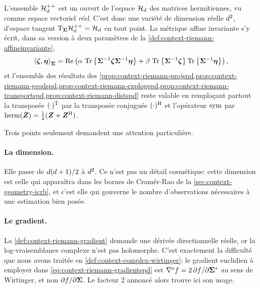 \begin{property}
\label{prop:context-riemann-conehermitien}
  L'ensemble $\mathcal{H}_{d}^{++}$ est un ouvert de l'espace $\mathcal{H}_{d}$ des matrices hermitiennes, vu comme espace vectoriel \emph{réel}. C'est donc une variété de dimension réelle $d^2$, d'espace tangent $\mathrm{T}_{\boldsymbol{\Sigma}}\mathcal{H}_{d}^{++}=\mathcal{H}_{d}$ en tout point. La métrique affine invariante s'y écrit, dans sa version à deux paramètres de la \cref{def:context-riemann-affineinvariante},
  \begin{equation}
    \left\langle \boldsymbol{\zeta}, \boldsymbol{\eta} \right\rangle_{\boldsymbol{\Sigma}}
    =
    \operatorname{\operatorname{Re}}\left(
      \alpha\,\operatorname{\operatorname{Tr}}\left\{{\boldsymbol{\Sigma}}^{-1}\boldsymbol{\zeta}{\boldsymbol{\Sigma}}^{-1}\boldsymbol{\eta}\right\}
      +
      \beta\,\operatorname{\operatorname{Tr}}\left\{{\boldsymbol{\Sigma}}^{-1}\boldsymbol{\zeta}\right\}\operatorname{\operatorname{Tr}}\left\{{\boldsymbol{\Sigma}}^{-1}\boldsymbol{\eta}\right\}
    \right),
    \label{eq:context-riemann-metriquecomplexe}
  \end{equation}
  et l'ensemble des résultats des \cref{prop:context-riemann-projspd,prop:context-riemann-geodspd,prop:context-riemann-explogspd,prop:context-riemann-transportspd,prop:context-riemann-distspd} reste valable en remplaçant partout la transposée $(\cdot)^{\mathrm{T}}$ par la transposée conjuguée $(\cdot)^{\mathrm{H}}$ et l'opérateur $\operatorname{\operatorname{sym}}$ par $\operatorname{\operatorname{herm}}(\boldsymbol{Z})=\tfrac{1}{2}(\boldsymbol{Z}+\boldsymbol{Z}^{\mathrm{H}})$.
\end{property}

Trois points seulement demandent une attention particulière.

\paragraph{La dimension.} Elle passe de $d(d+1)/2$ à $d^2$. Ce n'est pas un détail cosmétique: cette dimension est celle qui apparaîtra dans les bornes de Cramér-Rao de la \cref{sec:context-geometry-icrb}, et c'est elle qui gouverne le nombre d'observations nécessaires à une estimation bien posée.

\paragraph{Le gradient.} La \cref{def:context-riemann-gradient} demande une dérivée directionnelle réelle, or la log-vraisemblance complexe n'est pas holomorphe. C'est exactement la difficulté que nous avons traitée en \cref{def:context-complex-wirtinger}: le gradient euclidien à employer dans \cref{eq:context-riemann-gradientspd} est $\nabla^{\mathrm{e}}f=2\,\partial f/\partial{\boldsymbol{\Sigma}}^{*}$ au sens de Wirtinger, et non $\partial f/\partial\boldsymbol{\Sigma}$. Le facteur $2$ annoncé alors trouve ici son usage.

